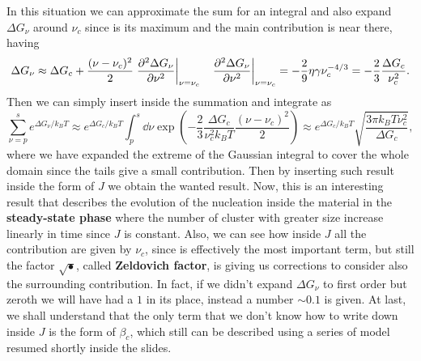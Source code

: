 {\begin{equation}
    \end{equation}
    In this situation we can approximate the sum for an integral and also expand $\Delta G_\nu$ around $\nu_c$ since is its maximum and the main contribution is near there, having
    \begin{align}
        &\Delta G_\nu \approx \Delta G_c + \frac{(\nu - \nu_c)^2}{2}\eval{\pdv[2]{\Delta G_\nu}{\nu}}_{\nu = \nu_c} &\eval{\pdv[2]{\Delta G_\nu}{\nu}}_{\nu = \nu_c} = -\frac{2}{9}\eta\gamma\nu_c^{-4/3} = -\frac{2}{3}\frac{\Delta G_c}{\nu_c^2}.
    \end{align}
    Then we can simply insert inside the summation and integrate as
    \begin{equation}
        \sum_{\nu=p}^s e^{\Delta G_\nu/k_BT} \approx e^{\Delta G_{c}/k_BT} \int_p^s \dd \nu \exp\left( -\frac{2}{3}\frac{\Delta G_c}{\nu_c^2k_BT}\frac{(\nu - \nu_c)^2}{2} \right) \approx e^{\Delta G_{c}/k_BT}\sqrt{\frac{3\pi k_BT\nu_c^2}{\Delta G_c}},
    \end{equation}
    where we have expanded the extreme of the Gaussian integral to cover the whole domain since the tails give a small contribution. Then by inserting such result inside the form of $J$ we obtain the wanted result.
}
Now, this is an interesting result that describes the evolution of the nucleation inside the material in the \textbf{steady-state phase} where the number of cluster with greater size increase linearly in time since $J$ is constant. Also, we can see how inside $J$ all the contribution are given by $\nu_c$, since is effectively the most important term, but still the factor $\sqrt{\bullet}$, called \textbf{Zeldovich factor}, is giving us corrections to consider also the surrounding contribution. In fact, if we didn't expand $\Delta G_\nu$ to first order but zeroth we will have had a $1$ in its place, instead a number $\sim 0.1$ is given. At last, we shall understand that the only term that we don't know how to write down inside $J$ is the form of $\beta_c$, which still can be described using a series of model resumed shortly inside the slides.